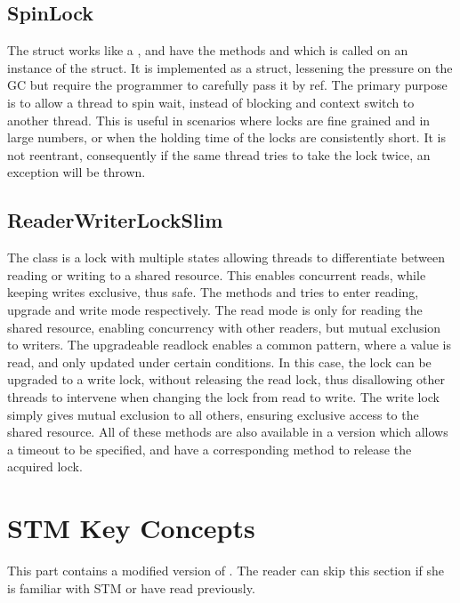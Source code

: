\subsection{SpinLock}
The  struct works like a , and have the methods   and  which is called on an instance of the struct. It is implemented as a struct, lessening the pressure on the \ac{GC} but require the programmer to carefully pass it by ref. The primary purpose is to allow a thread to spin wait, instead of blocking and context switch to another thread. This is useful in scenarios where locks are fine grained and in large numbers, or when the holding  time of the locks are consistently short. It is not reentrant, consequently if the same thread tries to take the lock twice, an exception will be thrown. 

\subsection{ReaderWriterLockSlim}
The class  is a lock with multiple states allowing threads to differentiate between reading or writing to a shared resource. This enables concurrent reads, while keeping writes exclusive, thus safe. The methods   and  tries to enter reading, upgrade and write mode respectively. The read mode is only for reading the shared resource, enabling concurrency with other readers, but mutual exclusion to writers. The upgradeable readlock enables a common pattern, where a value is read, and only updated under certain conditions. In this case, the lock can be upgraded to a write lock, without releasing the read lock, thus disallowing other threads to intervene when changing the lock from read to write. The write lock simply gives mutual exclusion to all others, ensuring exclusive access to the shared resource. All of these methods are also available in a version which allows a timeout to be specified, and have a corresponding  method to release the acquired lock.


\section{STM Key Concepts}
This part contains a modified version of \cite[p. 43-48]{dpt907e14trending}. The reader can skip this section if she is familiar with \ac{STM} or have read \cite[chap. 5]{dpt907e14trending} previously.
\label{chap:stm_key_concepts}

